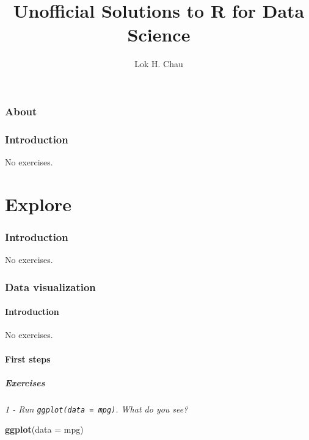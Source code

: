 \documentclass[]{article}
\title{Unofficial Solutions to R for Data Science}
\author{Lok H. Chau}
\date{}
\newenvironment{Shaded}{\begin{snugshade}}{\end{snugshade}}
\newcommand{\KeywordTok}[1]{\textcolor[rgb]{0.13,0.29,0.53}{\textbf{#1}}}
\newcommand{\DataTypeTok}[1]{\textcolor[rgb]{0.13,0.29,0.53}{#1}}
\newcommand{\NormalTok}[1]{#1}
\theoremstyle{definition}
\theoremstyle{definition}
\theoremstyle{definition}
\theoremstyle{remark}
\begin{document}
\maketitle

{
\setcounter{tocdepth}{2}
\tableofcontents
}
\section*{About}\label{about}

\section{Introduction}\label{introduction}

No exercises.

\part{Explore}\label{part-explore}

\section{Introduction}\label{introduction-1}

No exercises.

\section{Data visualization}\label{data-visualization}

\subsection{Introduction}\label{introduction-2}

No exercises.

\subsection{First steps}\label{first-steps}

\subsubsection{Exercises}\label{exercises}

\emph{1 - Run \texttt{ggplot(data\ =\ mpg)}. What do you see?}

\begin{Shaded}
\begin{Highlighting}[]
\KeywordTok{ggplot}\NormalTok{(}\DataTypeTok{data =}\NormalTok{ mpg)}
\end{Highlighting}
\end{Shaded}
\end{document}
